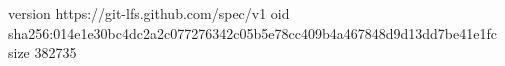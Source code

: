 version https://git-lfs.github.com/spec/v1
oid sha256:014e1e30bc4dc2a2c077276342c05b5e78cc409b4a467848d9d13dd7be41e1fc
size 382735
